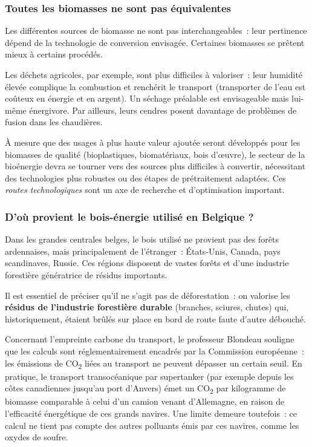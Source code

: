 \subsubsection{Toutes les biomasses ne sont pas équivalentes}

Les différentes sources de biomasse ne sont pas interchangeables~: leur pertinence dépend de la technologie de conversion envisagée. Certaines biomasses se prêtent mieux à certains procédés.

Les déchets agricoles, par exemple, sont plus difficiles à valoriser~: leur humidité élevée complique la combustion et renchérit le transport (transporter de l'eau est coûteux en énergie et en argent). Un séchage préalable est envisageable mais lui-même énergivore. Par ailleurs, leurs cendres posent davantage de problèmes de fusion dans les chaudières.

À mesure que des usages à plus haute valeur ajoutée seront développés pour les biomasses de qualité (bioplastiques, biomatériaux, bois d'œuvre), le secteur de la bioénergie devra se tourner vers des sources plus difficiles à convertir, nécessitant des technologies plus robustes ou des étapes de prétraitement adaptées. Ces \textit{routes technologiques} sont un axe de recherche et d'optimisation important.

\subsubsection{D'où provient le bois-énergie utilisé en Belgique ?}

Dans les grandes centrales belges, le bois utilisé ne provient pas des forêts ardennaises, mais principalement de l'étranger~: États-Unis, Canada, pays scandinaves, Russie. Ces régions disposent de vastes forêts et d'une industrie forestière génératrice de résidus importants.

Il est essentiel de préciser qu'il ne s'agit pas de déforestation~: on valorise les \textbf{résidus de l'industrie forestière durable} (branches, sciures, chutes) qui, historiquement, étaient brûlés sur place en bord de route faute d'autre débouché.

Concernant l'empreinte carbone du transport, le professeur Blondeau souligne que les calculs sont réglementairement encadrés par la Commission européenne~: les émissions de CO\textsubscript{2} liées au transport ne peuvent dépasser un certain seuil. En pratique, le transport transocéanique par supertanker (par exemple depuis les côtes canadiennes jusqu'au port d'Anvers) émet un CO\textsubscript{2} par kilogramme de biomasse comparable à celui d'un camion venant d'Allemagne, en raison de l'efficacité énergétique de ces grands navires. Une limite demeure toutefois~: ce calcul ne tient pas compte des autres polluants émis par ces navires, comme les oxydes de soufre.

